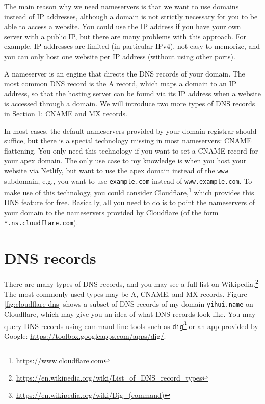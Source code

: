 \documentclass[12pt,]{krantz}
\renewcommand{\href}[2]{#2\footnote{\url{#1}}}
\theoremstyle{definition}
\theoremstyle{definition}
\theoremstyle{definition}
\theoremstyle{remark}
\begin{document}
The main reason why we need nameservers is that we
want to use domains instead of IP addresses, although a domain is not
strictly necessary for you to be able to access a website. You could use
the IP address if you have your own server with a public IP, but there
are many problems with this approach. For example, IP addresses are
limited (in particular IPv4), not easy to memorize, and you can only
host one website per IP address (without using other ports).

A nameserver is an engine that directs the DNS records of your domain.
The most common DNS record is the A record, which maps a domain to an IP
address, so that the hosting server can be found via its IP address when
a website is accessed through a domain. We will introduce two more types
of DNS records in Section \ref{dns-records}: CNAME and MX records.

In most cases, the default nameservers provided by your domain registrar
should suffice, but there is a special technology missing in most
nameservers: CNAME flattening. You only need this technology if you want
to set a CNAME record for your apex domain. The only use case to my
knowledge is when you host your website via Netlify, but want to use the
apex domain instead of the \texttt{www} subdomain, e.g., you want to use
\texttt{example.com} instead of \texttt{www.example.com}. To make use of
this technology, you could consider
\href{https://www.cloudflare.com}{Cloudflare,} which provides this DNS
feature for free. Basically, all you need to do is to point the
nameservers of your domain to the nameservers provided by Cloudflare (of
the form \texttt{*.ns.cloudflare.com}).

\hypertarget{dns-records}{%
\section{DNS records}\label{dns-records}}

There are many types of DNS records, and you may see
a full list on
\href{https://en.wikipedia.org/wiki/List_of_DNS_record_types}{Wikipedia.}
The most commonly used types may be A, CNAME, and MX records. Figure
\ref{fig:cloudflare-dns} shows a subset of DNS records of my domain
\texttt{yihui.name} on Cloudflare, which may give you an idea of what
DNS records look like. You may query DNS records using command-line
tools such as
\href{https://en.wikipedia.org/wiki/Dig_(command)}{\texttt{dig}} or an
app provided by Google: \url{https://toolbox.googleapps.com/apps/dig/}.
\end{document}
